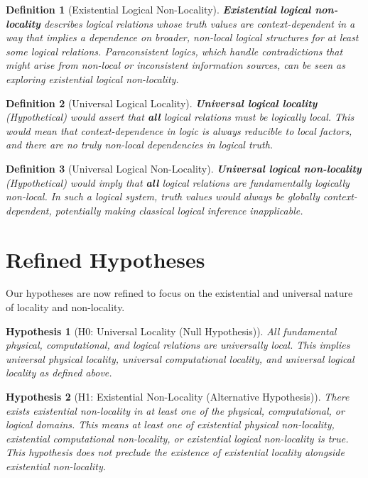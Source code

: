 \documentclass{article}
\newtheorem{definition}{Definition}
\newtheorem{hypothesis}{Hypothesis}
\begin{document}
	\begin{definition}[Existential Logical Non-Locality]
		\textbf{Existential logical non-locality} describes logical relations whose truth values are context-dependent in a way that implies a dependence on broader, non-local logical structures for at least some logical relations. Paraconsistent logics, which handle contradictions that might arise from non-local or inconsistent information sources, can be seen as exploring existential logical non-locality.
	\end{definition}

	\begin{definition}[Universal Logical Locality]
		\textbf{Universal logical locality} (Hypothetical) would assert that \textbf{all} logical relations must be logically local. This would mean that context-dependence in logic is always reducible to local factors, and there are no truly non-local dependencies in logical truth.
	\end{definition}

	\begin{definition}[Universal Logical Non-Locality]
		\textbf{Universal logical non-locality} (Hypothetical) would imply that \textbf{all} logical relations are fundamentally logically non-local. In such a logical system, truth values would always be globally context-dependent, potentially making classical logical inference inapplicable.
	\end{definition}

	\section{Refined Hypotheses}

	Our hypotheses are now refined to focus on the existential and universal nature of locality and non-locality.

	\begin{hypothesis}[H0: Universal Locality (Null Hypothesis)]
		All fundamental physical, computational, and logical relations are universally local.  This implies universal physical locality, universal computational locality, and universal logical locality as defined above.
	\end{hypothesis}

	\begin{hypothesis}[H1: Existential Non-Locality (Alternative Hypothesis)]
		There exists existential non-locality in at least one of the physical, computational, or logical domains.  This means at least one of existential physical non-locality, existential computational non-locality, or existential logical non-locality is true.  This hypothesis does not preclude the existence of existential locality alongside existential non-locality.
	\end{hypothesis}
\end{document}
